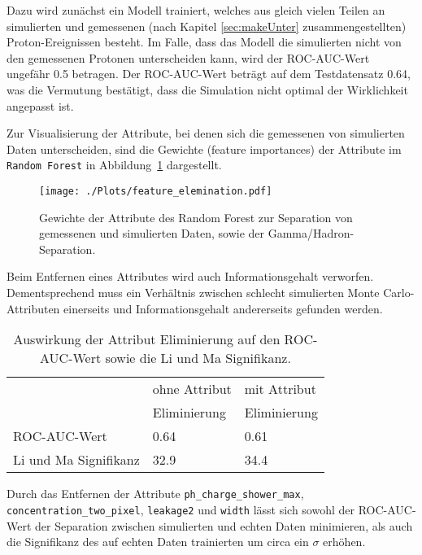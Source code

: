 Dazu wird zunächst ein Modell trainiert, welches aus gleich vielen Teilen an simulierten und gemessenen (nach Kapitel \ref{sec:makeUnter} zusammengestellten) Proton-Ereignissen besteht. 
Im Falle, dass das Modell die simulierten nicht von den gemessenen Protonen unterscheiden kann, wird der ROC-AUC-Wert ungefähr \num{0.5} betragen. 
Der ROC-AUC-Wert beträgt auf dem Testdatensatz \num{0.64}, was die Vermutung bestätigt, dass die Simulation nicht optimal der Wirklichkeit angepasst ist. 

Zur Visualisierung der Attribute, bei denen sich die gemessenen von simulierten Daten unterscheiden, sind die Gewichte (feature importances) der Attribute im \texttt{Random Forest} in Abbildung~\ref{fig:featureimportance} dargestellt. 
\begin{figure}[H]
  \centering
  \texttt{[image: ./Plots/feature\_elemination.pdf]}
  \caption{Gewichte der Attribute des Random Forest zur Separation von gemessenen und simulierten Daten, sowie der Gamma/Hadron-Separation.}
  \label{fig:featureimportance}
\end{figure}
Beim Entfernen eines Attributes wird auch Informationsgehalt verworfen. 
Dementsprechend muss ein Verhältnis zwischen schlecht simulierten Monte Carlo-Attributen einerseits und Informationsgehalt andererseits gefunden werden.
\begin{table}
  \centering
  \caption{Auswirkung der Attribut Eliminierung auf den ROC-AUC-Wert sowie die Li und Ma Signifikanz.}
  \begin{tabular}{l s s}
	\toprule
								& ohne Attribut & mit Attribut \\
								& Eliminierung 	& Eliminierung \\
	  	\cmidrule(r){2-3} 
	  	ROC-AUC-Wert 			& \num{0.64} & \num{0.61} \\
		Li und Ma Signifikanz 	& \SI{32.9}{\sigma} & \SI{34.4}{\sigma} \\
	\bottomrule
  \end{tabular}
  \label{tab:<+label+>}
\end{table}
Durch das Entfernen der Attribute \texttt{ph\_charge\_shower\_max}, \texttt{concentration\_two\_pixel}, \texttt{leakage2} und \texttt{width} lässt sich sowohl der ROC-AUC-Wert der Separation zwischen simulierten und echten Daten minimieren, als auch die Signifikanz des auf echten Daten trainierten  um circa ein $\sigma$ erhöhen.
